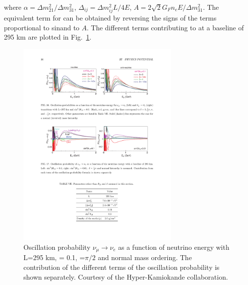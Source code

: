 where $ \alpha = \Delta m^2_{21} / \Delta m^2_{31}$, $\Delta_{ij}= \Delta m^2_{ij} L / 4 E$, $A= 2\sqrt 2 G_F n_e E/ \Delta m^2_{31}$.
The equivalent term for \pappb can be obtained by reversing the signs of the terms proportional to sin\dcp and to $A$. The different terms contributing to \papp at a baseline of 295 km are plotted in Fig.~\ref{fig:t2kappprob}.


\begin{figure} [htbp!]
\begin{center}
\includegraphics[width=8cm]{figures/papp_prob_2.pdf}
\caption{\label{fig:t2kappprob} Oscillation probability $\nu_\mu \rightarrow \nu_e$ as a function of neutrino energy with L=295 km, \stot = 0.1, \dcp=$\pi/2$ and normal mass ordering. The contribution of the different terms of the oscillation probability is shown separately. Courtesy of the Hyper-Kamiokande collaboration.}
\end{center}
\end{figure}


